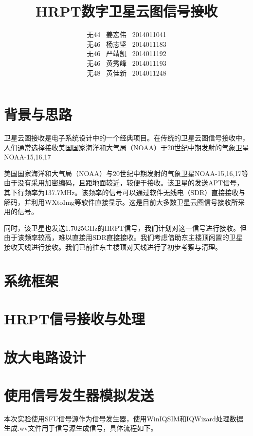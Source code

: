 \documentclass[UTF8]{ctexart}
\begin{document}
\title{\textbf{HRPT数字卫星云图信号接收}}
\author{无44 \ 姜宏伟 \ 2014011041\\
        无46 \ 杨志坚 \ 2014011183\\
        无46 \ 严靖凯 \ 2014011192\\
        无46 \ 黄秀峰 \ 2014011193\\
        无48 \ 黄佳新 \ 2014011248}
\date{}
\maketitle

\section{背景与思路}

卫星云图接收是电子系统设计中的一个经典项目。在传统的卫星云图信号接收中，人们通常选择接收美国国家海洋和大气局（NOAA）于20世纪中期发射的气象卫星NOAA-15,16,17

美国国家海洋和大气局（NOAA）与20世纪中期发射的气象卫星NOAA-15,16,17等由于没有采用加密编码，且距地面较近，较便于接收。该卫星的发送APT信号，其下行频率为137.7MHz。该频率的信号可以通过软件无线电（SDR）直接接收与解码，并利用WXtoImg等软件直接显示。这是目前大多数卫星云图信号接收所采用的信号。

同时，该卫星也发送1.7025GHz的HRPT信号，我们计划对这一信号进行接收。但由于该频率较高，难以直接用SDR直接接收。我们考虑借助东主楼顶闲置的卫星接收天线进行接收。我们已前往东主楼顶对天线进行了初步考察与清理。


\section{系统框架}

\section{HRPT信号接收与处理}

\section{放大电路设计}

\section{使用信号发生器模拟发送}

本次实验使用SFU信号源作为信号发生器，使用WinIQSIM和IQWizard处理数据生成.wv文件用于信号源生成信号，具体流程如下。
\end{document}
